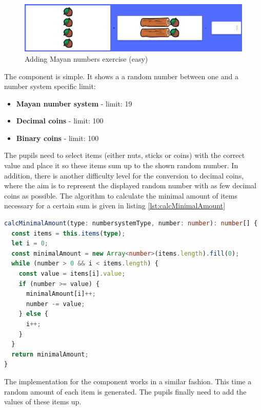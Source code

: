\begin{figure} 
  \centering
  \includegraphics[width=1.0 \columnwidth]{figures/mayas_addition.png}
  \caption{Adding Mayan numbers exercise (easy)} 
  \label{fig:mayanAddition} 
\end{figure}

The  component is simple. It shows a a random number between one and a number system specific limit:

\begin{itemize}
  \item \textbf{Mayan number system} - limit: 19
  \item \textbf{Decimal coins} - limit: 100
  \item \textbf{Binary coins} - limit: 100
\end{itemize}

The pupils need to select items (either nuts, sticks or coins) with the correct value and place it so these items sum up to the shown random number.
In addition, there is another difficulty level for the conversion to decimal coins, where the aim is to represent the displayed random number with as few decimal coins as possible. The algorithm to calculate the minimal amount of items necessary for a certain sum is given in listing \ref{lst:calcMinimalAmount} 


\begin{lstlisting}[language=TypeScript,caption={Calculate minimal amount of items needed to reach a certain number},label={lst:calcMinimalAmount}]
calcMinimalAmount(type: numbersystemType, number: number): number[] {
  const items = this.items(type);
  let i = 0;
  const minimalAmount = new Array<number>(items.length).fill(0);
  while (number > 0 && i < items.length) {
    const value = items[i].value;
    if (number >= value) {
      minimalAmount[i]++;
      number -= value;
    } else {
      i++;
    }
  }
  return minimalAmount;
}
\end{lstlisting}

The implementation for the  component works in a similar fashion. This time a random amount of each item is generated.
The pupils finally need to add the values of these items up.

